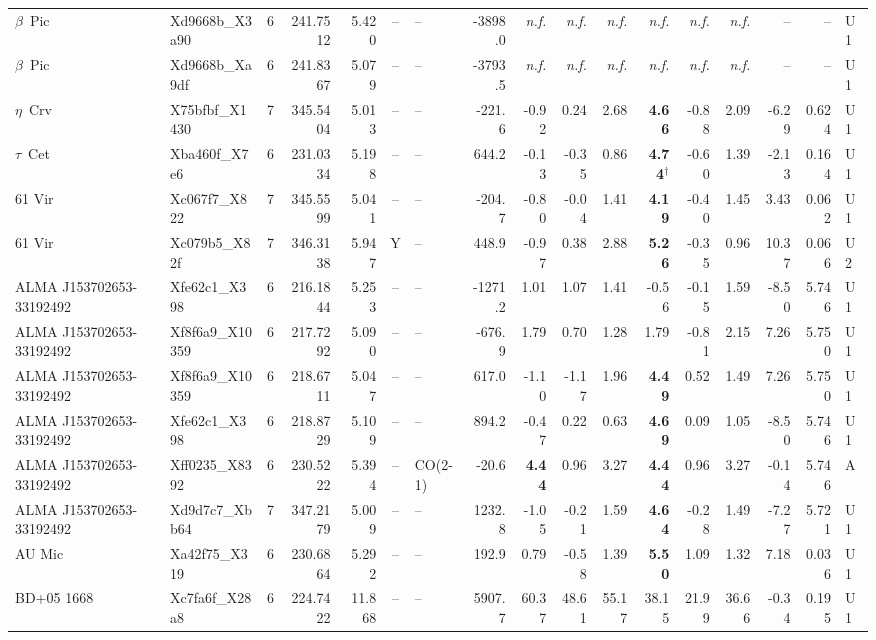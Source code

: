\begin{tabular}{@{}l@{~}l@{~}c@{~}r@{~}r@{~}c@{~}l@{~}r@{~~}r@{~}r@{~}r@{~~}r@{~}r@{~}r@{~~}r@{~}r@{~}l@{}}
$\beta$~Pic & Xd9668b\_X3a90 & 6 & 241.7512 & 5.420 & -- & -- & -3898.0 & \emph{n.f.} & \emph{n.f.} & \emph{n.f.} & \emph{n.f.} & \emph{n.f.} & \emph{n.f.} & -- & -- & U1 \\
$\beta$~Pic & Xd9668b\_Xa9df & 6 & 241.8367 & 5.079 & -- & -- & -3793.5 & \emph{n.f.} & \emph{n.f.} & \emph{n.f.} & \emph{n.f.} & \emph{n.f.} & \emph{n.f.} & -- & -- & U1 \\
$\eta$~Crv & X75bfbf\_X1430 & 7 & 345.5404 & 5.013 & -- & -- & -221.6 & -0.92 & 0.24 & 2.68 & \textbf{4.66} & -0.88 & 2.09 & -6.29 & 0.624 & U1 \\
$\tau$~Cet & Xba460f\_X7e6 & 6 & 231.0334 & 5.198 & -- & -- & 644.2 & -0.13 & -0.35 & 0.86 & \textbf{4.74}$^{\dagger}$ & -0.60 & 1.39 & -2.13 & 0.164 & U1 \\
61 Vir & Xc067f7\_X822 & 7 & 345.5599 & 5.041 & -- & -- & -204.7 & -0.80 & -0.04 & 1.41 & \textbf{4.19} & -0.40 & 1.45 & 3.43 & 0.062 & U1 \\
61 Vir & Xc079b5\_X82f & 7 & 346.3138 & 5.947 & Y & -- & 448.9 & -0.97 & 0.38 & 2.88 & \textbf{5.26} & -0.35 & 0.96 & 10.37 & 0.066 & U2 \\
ALMA J153702653-33192492 & Xfe62c1\_X398 & 6 & 216.1844 & 5.253 & -- & -- & -1271.2 & 1.01 & 1.07 & 1.41 & -0.56 & -0.15 & 1.59 & -8.50 & 5.746 & U1 \\
ALMA J153702653-33192492 & Xf8f6a9\_X10359 & 6 & 217.7292 & 5.090 & -- & -- & -676.9 & 1.79 & 0.70 & 1.28 & 1.79 & -0.81 & 2.15 & 7.26 & 5.750 & U1 \\
ALMA J153702653-33192492 & Xf8f6a9\_X10359 & 6 & 218.6711 & 5.047 & -- & -- & 617.0 & -1.10 & -1.17 & 1.96 & \textbf{4.49} & 0.52 & 1.49 & 7.26 & 5.750 & U1 \\
ALMA J153702653-33192492 & Xfe62c1\_X398 & 6 & 218.8729 & 5.109 & -- & -- & 894.2 & -0.47 & 0.22 & 0.63 & \textbf{4.69} & 0.09 & 1.05 & -8.50 & 5.746 & U1 \\
ALMA J153702653-33192492 & Xff0235\_X8392 & 6 & 230.5222 & 5.394 & -- & CO(2-1) & -20.6 & \textbf{4.44} & 0.96 & 3.27 & \textbf{4.44} & 0.96 & 3.27 & -0.14 & 5.746 & A \\
ALMA J153702653-33192492 & Xd9d7c7\_Xbb64 & 7 & 347.2179 & 5.009 & -- & -- & 1232.8 & -1.05 & -0.21 & 1.59 & \textbf{4.64} & -0.28 & 1.49 & -7.27 & 5.721 & U1 \\
AU Mic & Xa42f75\_X319 & 6 & 230.6864 & 5.292 & -- & -- & 192.9 & 0.79 & -0.58 & 1.39 & \textbf{5.50} & 1.09 & 1.32 & 7.18 & 0.036 & U1 \\
BD+05 1668 & Xc7fa6f\_X28a8 & 6 & 224.7422 & 11.868 & -- & -- & 5907.7 & 60.37 & 48.61 & 55.17 & 38.15 & 21.99 & 36.66 & -0.34 & 0.195 & U1 \\

\end{tabular}
